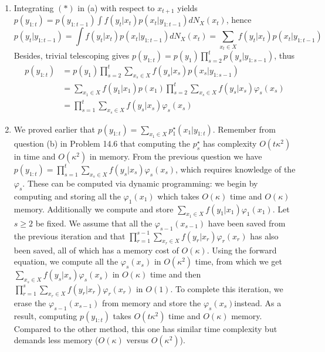 \documentclass[a4paper,11pt, hidelinks]{article}
\begin{document}
\begin{enumerate}[label=(\alph*)]
	\item Integrating $(*)$ in (a) with respect to $x_{t+1}$ yields $\displaystyle p(y_{1:t}) = p(y_{1:t-1}) \int f(y_t|x_t) p(x_{t}|y_{1:t-1})  dN_X(x_t)$, hence 
	$$p(y_t|y_{1:t-1}) = \int f(y_t|x_t) p(x_{t}|y_{1:t-1})  dN_X(x_t) = \sum_{x_t\in X} f(y_t|x_t) p(x_{t}|y_{1:t-1})$$
	Besides, trivial telescoping gives $\displaystyle p(y_{1:t}) = p(y_1)\prod_{s=2}^t p(y_s|y_{1:s-1})$, thus 
	$$\begin{aligned}
	p(y_{1:t}) &= p(y_1) \prod_{s=2}^t \sum_{x_s\in X} f(y_s|x_s) p(x_{s}|y_{1:s-1}) \\
	&= \sum_{x_1\in X} f(y_1|x_1)p(x_1) \prod_{s=2}^t \sum_{x_s\in X} f(y_s|x_s) \varphi_{s}(x_s)\\
	&= \prod_{s=1}^t \sum_{x_s\in X} f(y_s|x_s) \varphi_{s}(x_s)
	\end{aligned}$$

	\item We proved earlier that $p(y_{1:t}) = \sum_{x_1\in X} p_1^\star(x_1|y_{1:t})$. Remember from question (b) in Problem 14.6 that computing the $p_s^\star$ has complexity $O(t\kappa^2)$ in time and $O(\kappa^2)$ in memory.\newline
	\newline
	From the previous question we have $\displaystyle p(y_{1:t}) = \prod_{s=1}^t \sum_{x_s\in X} f(y_s|x_s) \varphi_{s}(x_s)$, which requires knowledge of the $\varphi_{s}$. These can be computed via dynamic programming: we begin by computing and storing all the $\varphi_1(x_1)$ which takes $O(\kappa)$ time and $O(\kappa)$ memory. Additionally we compute and store $\sum_{x_1\in X} f(y_1|x_1) \varphi_{1}(x_1)$.  Let $s\geq 2$ be fixed. We assume that all the $\varphi_{s-1}(x_{s-1})$ have been saved from the previous iteration and that $\prod_{r=1}^{s-1} \sum_{x_r\in X} f(y_r|x_r) \varphi_{r}(x_r)$ has also been saved, all of which has a memory cost of $O(\kappa)$. Using the forward equation, we compute all the $\varphi_{s}(x_{s})$ in $O(\kappa^2)$ time, from which we get $\sum_{x_s\in X} f(y_s|x_s) \varphi_{s}(x_s)$ in $O(\kappa)$ time and then $\prod_{r=1}^{s} \sum_{x_r\in X} f(y_r|x_r) \varphi_{r}(x_r)$ in $O(1)$. To complete this iteration, we erase the $\varphi_{s-1}(x_{s-1})$ from memory and store the $\varphi_{s}(x_{s})$instead.\newline\newline 
	As a result, computing $p(y_{1:t})$ takes $O(t\kappa^2)$ time and $O(\kappa)$ memory. Compared to the other method, this one has similar time complexity but demands less memory ($O(\kappa)$ versus $O(\kappa^2)$).


\end{enumerate}
\end{document}
